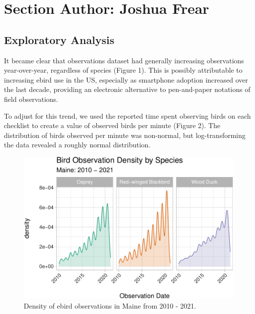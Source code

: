 \documentclass[
  12pt,
]{article}
\begin{document}
\hypertarget{section-author-joshua-frear}{%
\section{Section Author: Joshua
Frear}\label{section-author-joshua-frear}}

\hypertarget{exploratory-analysis}{%
\subsection{Exploratory Analysis}\label{exploratory-analysis}}

It became clear that observations dataset had generally increasing
observations year-over-year, regardless of species (Figure 1). This is
possibly attributable to increasing ebird use in the US, especially as
smartphone adoption increased over the last decade, providing an
electronic alternative to pen-and-paper notations of field observations.

To adjust for this trend, we used the reported time spent observing
birds on each checklist to create a value of observed birds per minute
(Figure 2). The distribution of birds observed per minute was
non-normal, but log-transforming the data revealed a roughly normal
distribution.

\begin{figure}
\centering
\includegraphics{Project_report_ME_files/figure-latex/density.plot-1.pdf}
\caption{Density of ebird observations in Maine from 2010 - 2021.}
\end{figure}
\end{document}
